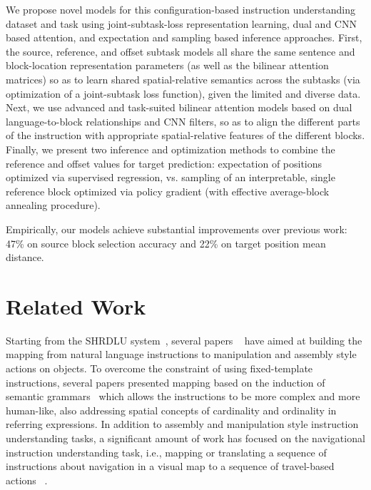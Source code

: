 \documentclass[letterpaper]{article} %
\begin{document}
We propose novel models for this configuration-based instruction understanding dataset and task using joint-subtask-loss representation learning, dual and CNN based attention, and expectation and sampling based inference approaches.
First, the source, reference, and offset subtask models all share the same sentence and block-location representation parameters (as well as the bilinear attention matrices) so as to learn shared spatial-relative semantics across the subtasks (via optimization of a joint-subtask loss function), given the limited and diverse data. Next, we use advanced and task-suited bilinear attention models based on dual language-to-block relationships and CNN filters, so as to align the different parts of the instruction with appropriate spatial-relative features of the different blocks. Finally, we present two inference and optimization methods to combine the reference and offset values for target prediction: expectation of positions optimized via supervised regression, vs. sampling of an interpretable, single reference block optimized via policy gradient (with effective average-block annealing procedure).

Empirically, our models achieve substantial improvements over previous work: 47\% on source block selection accuracy and 22\% on target position mean distance.

\section{Related Work}


Starting from the SHRDLU system~\cite{winograd72}, several papers ~\cite{branavan2009reinforcement,howard2014natural,matuszek2014learning} have aimed at building the mapping from natural language instructions to manipulation and assembly style actions on objects.
To overcome the constraint of using fixed-template instructions, several papers presented mapping based on the induction of semantic grammars~\cite{zettlemoyer2005learning,tellex2011understanding,matuszek2012joint,misra2015environment,paul2016efficient} which allows the instructions to be more complex and more human-like, also addressing spatial concepts of cardinality and ordinality in referring expressions.
In addition to assembly and manipulation style instruction understanding tasks, a significant amount of work has focused on the navigational instruction understanding task, i.e., mapping or translating a sequence of instructions about navigation in a visual map to a sequence of travel-based actions~\cite{chen2011learning,artzi2013weakly,mei2015listen,andreas2015alignment} .
\end{document}
